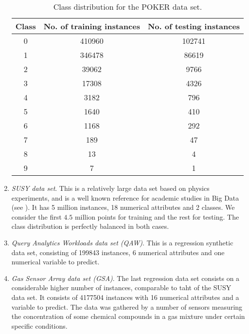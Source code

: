 \begin{enumerate}[1.]
    \begin{table}[h!]
  \centering
  \caption{Class distribution for the POKER data set.}
  \label{tab:poker-class}
  \begin{tabular}{ccc}
    \toprule
Class & No. of training instances & No. of testing instances \\ \midrule
0              & 410960                                & 102741                       \\
1              & 346478                                & 86619                        \\
2              & 39062                                 & 9766                         \\
3              & 17308                                 & 4326                         \\
4              & 3182                                  & 796                          \\
5              & 1640                                  & 410                          \\
6              & 1168                                  & 292                          \\
7              & 189                                   & 47                           \\
8              & 13                                    & 4                            \\
9              & 7                                     & 1\\
  \bottomrule
  \end{tabular}
  \end{table}

\item \textit{SUSY data set}. This is a relatively large data set based on physics experiments, and is a well known reference for academic studies in Big Data (see \cite {baldi2014searching}). It has 5 million instances, 18 numerical attributes and 2 classes. We consider the first $4.5$ million points for training and the rest for testing. The class distribution is perfectly balanced in both cases.

\item \textit{Query Analytics Workloads data set (QAW)}. This is a regression synthetic data set, consisting of 199843 instances, 6 numerical attributes and one numerical variable to predict.

\item \textit{Gas Sensor Array data set (GSA)}. The last regression data set consists on a considerable higher number of instances, comparable to taht of the SUSY data set. It consists of 4177504 instances with 16 numerical attributes and a variable to predict. The data was gathered by a number of sensors measuring the concentration of some chemical compounds in a gas mixture under certain specific conditions.
\end{enumerate}

